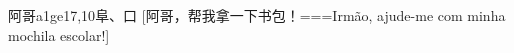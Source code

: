 \begin{EntryWithPhonetic}{阿哥}{a1ge1}{7,10}{⾩、⼝}
  [阿哥，帮我拿一下书包！===Irmão, ajude-me com minha mochila escolar!]
\end{EntryWithPhonetic}

